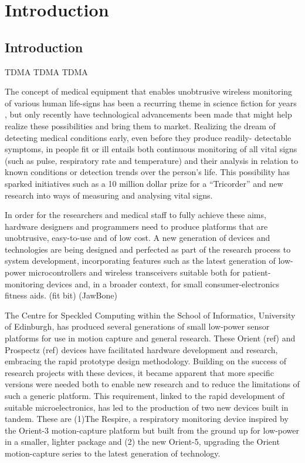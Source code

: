 
\chapter{Introduction}

\section{Introduction}

\acf{TDMA}
\ac{TDMA}
\ac{TDMA}

The concept of medical equipment that enables unobtrusive wireless monitoring of various human
life-signs has been a recurring theme in science fiction for years \cite{StarTrekStarFleetTechnicalManual1986}, but only recently have
technological advancements been made that might help realize these possibilities and bring them to
market. Realizing the dream of detecting medical conditions early, even before they produce readily-
detectable symptoms, in people fit or ill entails both continuous monitoring of all vital signs (such as
pulse, respiratory rate and temperature) and their analysis in relation to known conditions or
detection trends over the person’s life. This possibility has sparked initiatives such as a 10 million
dollar prize for a “Tricorder” \cite{XprizeHealth2012} and new research into ways of measuring and analysing vital
signs.


In order for the researchers and medical staff to fully achieve these aims, hardware designers and
programmers need to produce platforms that are unobtrusive, easy-to-use and of low cost. A new
generation of devices and technologies are being designed and perfected as part of the research
process to system development, incorporating features such as the latest generation of low-power
microcontrollers and wireless transceivers suitable both for patient-monitoring devices
and, in a broader context, for small  consumer-electronics fitness aids. (fit bit) (JawBone)


The Centre for Speckled Computing within the School of Informatics, University of
Edinburgh, has produced several generations of small low-power sensor platforms for use
in motion capture and general research. These Orient (ref) and Prospectz (ref) devices
have facilitated hardware development and research, embracing the rapid prototype
design methodology. Building on the success of research projects with these devices, it
became apparent that more specific versions were needed both to enable new research and to
reduce the limitations of such a generic platform. This requirement, linked to the rapid development
of suitable microelectronics, has led to the production of two new devices built in tandem. These are
(1)The Respire, a respiratory monitoring device inspired by the Orient-3 motion-capture platform
but built from the ground up for low-power in a smaller, lighter package and (2) the new Orient-5,
upgrading the Orient motion-capture series to the latest generation of technology.

